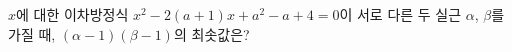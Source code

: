 $x$에 대한 이차방정식 $x^2-2(a+1)x+a^2-a+4=0$이 서로 다른 두 실근 $\alpha$, $\beta$를 가질 때, $(\alpha-1)(\beta-1)$의 최솟값은? 
